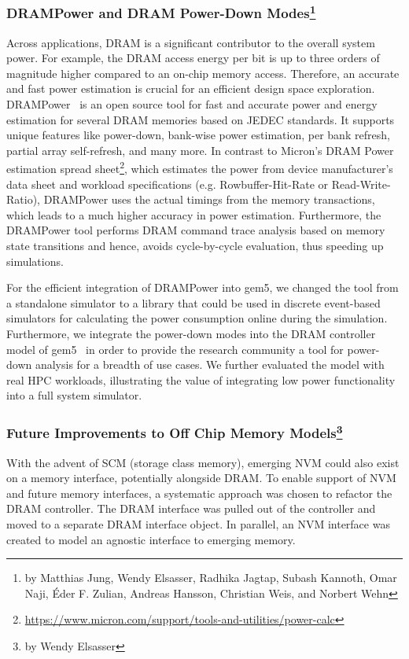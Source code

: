 \subsubsection[DRAMPower and DRAM Power-Down Modes]{DRAMPower and DRAM Power-Down Modes\footnote{by Matthias Jung, Wendy Elsasser, Radhika Jagtap, Subash Kannoth, Omar Naji, Éder F.
Zulian, Andreas Hansson, Christian Weis, and Norbert Wehn }}
%
Across applications, DRAM is a significant contributor to the overall system power.
For example, the DRAM access energy per bit is up to three orders of magnitude higher compared to an on-chip memory access.
Therefore, an accurate and fast power estimation is crucial for an efficient design space exploration.
DRAMPower~\cite{kargoo_14} is an open source tool for fast and accurate power and energy estimation for several DRAM memories based on JEDEC standards.
It supports unique features like power-down, bank-wise power estimation, per bank refresh, partial array self-refresh, and many more.
In contrast to Micron’s DRAM Power estimation spread sheet\footnote{\url{https://www.micron.com/support/tools-and-utilities/power-calc}}, which estimates the power from device manufacturer’s data sheet and workload specifications (e.g. Rowbuffer-Hit-Rate or Read-Write-Ratio), DRAMPower uses the actual timings from the memory transactions, which leads to a much higher accuracy in power estimation.
Furthermore, the DRAMPower tool performs DRAM command trace analysis based on memory state transitions and hence, avoids cycle-by-cycle evaluation, thus speeding up simulations.

For the efficient integration of DRAMPower into gem5, we changed the tool from a standalone simulator to a library that could be used in discrete event-based simulators for calculating the power consumption online during the simulation.
Furthermore, we integrate the power-down modes into the DRAM controller model of gem5~\cite{jagjun_17} in order to provide the research community a tool for power-down analysis for a breadth of use cases. We further evaluated the model with real HPC workloads, illustrating the value of integrating low power functionality into a full system simulator.
%
\subsubsection[Future Improvements to Off Chip Memory Models]{Future Improvements to Off Chip Memory Models\footnote{by Wendy Elsasser}}

With the advent of SCM (storage class memory), emerging NVM could also exist on a memory interface, potentially alongside DRAM.
To enable support of NVM and future memory interfaces, a systematic approach was chosen to refactor the DRAM controller.
The DRAM interface was pulled out of the controller and moved to a separate DRAM interface object.
In parallel, an NVM interface was created to model an agnostic interface to emerging memory.

